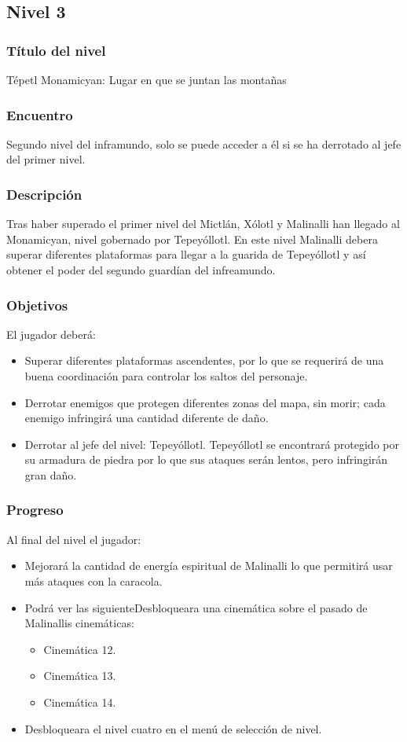 \documentclass[11pt,letterpaper]{article}
\begin{document}
	
\subsection{Nivel 3}
	\subsubsection{Título del nivel}
	Tépetl Monamicyan: Lugar en que se juntan las montañas	
	\subsubsection{Encuentro}
Segundo nivel del inframundo, solo se puede acceder a él si se ha derrotado al jefe del primer nivel.
	\subsubsection{Descripción}
	Tras haber superado el primer nivel del Mictlán, Xólotl y Malinalli han llegado al Monamicyan, nivel gobernado por Tepeyóllotl. En este nivel Malinalli debera superar diferentes plataformas para llegar a la guarida de Tepeyóllotl y así obtener el poder del segundo guardían del infreamundo.
	\subsubsection{Objetivos}
	El jugador deberá:
\begin{itemize}
	\item Superar diferentes plataformas ascendentes, por lo que se requerirá de una buena coordinación para controlar los saltos del personaje.
	\item Derrotar enemigos que protegen diferentes zonas del mapa, sin morir; cada enemigo infringirá una cantidad diferente de daño.
	\item Derrotar al jefe del nivel: Tepeyóllotl. Tepeyóllotl se encontrará protegido por su armadura de piedra por lo que sus ataques serán lentos, pero infringirán gran daño.
\end{itemize}
	\subsubsection{Progreso}
Al final del nivel el jugador:
\begin{itemize}
	\item Mejorará la cantidad de energía espiritual de Malinalli lo que permitirá usar más ataques con la caracola.
	\item Podrá ver las siguienteDesbloqueara una cinemática sobre el pasado de Malinallis cinemáticas: 
		\begin{itemize}
			\item Cinemática 12.
			\item Cinemática 13.
			\item Cinemática 14.
		\end{itemize}
	\item Desbloqueara el nivel cuatro en el menú de selección de nivel.
\end{itemize} 
\end{document}
